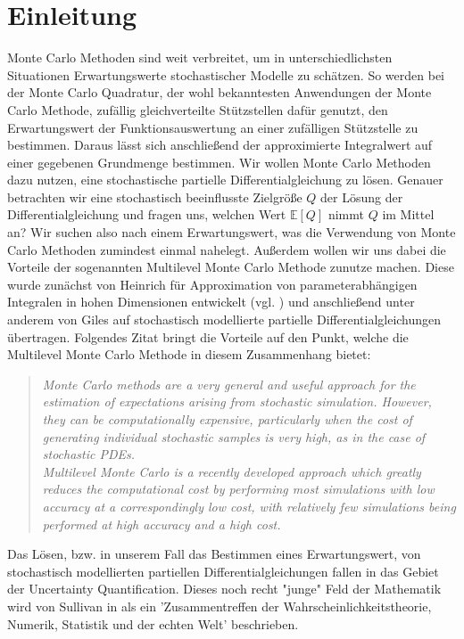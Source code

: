
\section{Einleitung}

Monte Carlo Methoden sind weit verbreitet, um in unterschiedlichsten Situationen Erwartungswerte stochastischer Modelle zu schätzen.
So werden bei der Monte Carlo Quadratur, der wohl bekanntesten Anwendungen der Monte Carlo Methode, zufällig gleichverteilte Stützstellen dafür genutzt, den Erwartungswert der Funktionsauswertung an einer zufälligen Stützstelle zu bestimmen. Daraus lässt sich anschließend der approximierte Integralwert auf einer gegebenen Grundmenge bestimmen. 
Wir wollen Monte Carlo Methoden dazu nutzen, eine stochastische partielle Differentialgleichung zu lösen. 
Genauer betrachten wir eine stochastisch beeinflusste Zielgröße $ Q $ der Lösung der Differentialgleichung und fragen uns, welchen Wert $ \mathbb{E}[Q] $ nimmt $ Q $ im Mittel an? Wir suchen also nach einem Erwartungswert, was die Verwendung von Monte Carlo Methoden zumindest einmal nahelegt. 
Außerdem wollen wir uns dabei die Vorteile der sogenannten Multilevel Monte Carlo Methode zunutze machen. Diese wurde zunächst von Heinrich für Approximation von parameterabhängigen Integralen in hohen Dimensionen entwickelt (vgl. \cite{heinrich2001multilevel}) und anschließend unter anderem von  Giles auf stochastisch modellierte partielle Differentialgleichungen übertragen. Folgendes Zitat bringt die Vorteile auf den Punkt, welche die Multilevel Monte Carlo Methode in diesem Zusammenhang bietet:
\begin{quote}
	\textit{Monte Carlo methods are a very general and useful approach for the estimation of expectations arising from stochastic simulation. However, they can be computationally expensive, particularly when the cost of generating individual stochastic samples is very high, as in the case of stochastic PDEs. \\ Multilevel Monte Carlo is a recently developed approach which greatly reduces the computational cost by performing most simulations with low accuracy at a correspondingly low cost, with relatively few simulations being performed at high accuracy and a high cost.}  \\
\end{quote}
Das Lösen, bzw. in unserem Fall das Bestimmen eines Erwartungswert, von stochastisch modellierten partiellen Differentialgleichungen fallen in das Gebiet der Uncertainty Quantification. Dieses noch recht "junge" Feld der Mathematik wird von Sullivan in \cite{sullivan2015introduction} als ein 'Zusammentreffen der Wahrscheinlichkeitstheorie, Numerik, Statistik und der echten Welt' beschrieben. \\
